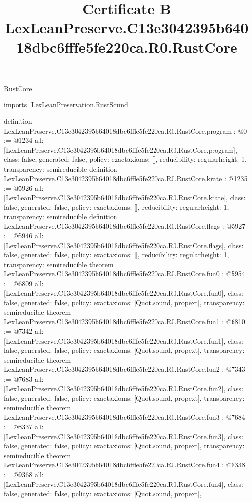\begin{lexlean}{RustCore}
\title{Certificate B LexLeanPreserve.C13e3042395b64018dbc6fffe5fe220ca.R0.RustCore}
\begin{coremodule}
imports [LexLeanPreservation.RustSound]

definition LexLeanPreserve.C13e3042395b64018dbc6fffe5fe220ca.R0.RustCore.program : @0 := @1234 {
  all: [LexLeanPreserve.C13e3042395b64018dbc6fffe5fe220ca.R0.RustCore.program],
  class: false,
  generated: false,
  policy: exact{axioms: []},
  reducibility: regular{height: 1},
  transparency: semireducible
}
definition LexLeanPreserve.C13e3042395b64018dbc6fffe5fe220ca.R0.RustCore.krate : @1235 := @5926 {
  all: [LexLeanPreserve.C13e3042395b64018dbc6fffe5fe220ca.R0.RustCore.krate],
  class: false,
  generated: false,
  policy: exact{axioms: []},
  reducibility: regular{height: 1},
  transparency: semireducible
}
definition LexLeanPreserve.C13e3042395b64018dbc6fffe5fe220ca.R0.RustCore.flags : @5927 := @5946 {
  all: [LexLeanPreserve.C13e3042395b64018dbc6fffe5fe220ca.R0.RustCore.flags],
  class: false,
  generated: false,
  policy: exact{axioms: []},
  reducibility: regular{height: 1},
  transparency: semireducible
}
theorem LexLeanPreserve.C13e3042395b64018dbc6fffe5fe220ca.R0.RustCore.fun0 : @5954 := @6809 {
  all: [LexLeanPreserve.C13e3042395b64018dbc6fffe5fe220ca.R0.RustCore.fun0],
  class: false,
  generated: false,
  policy: exact{axioms: [Quot.sound, propext]},
  transparency: semireducible
}
theorem LexLeanPreserve.C13e3042395b64018dbc6fffe5fe220ca.R0.RustCore.fun1 : @6810 := @7342 {
  all: [LexLeanPreserve.C13e3042395b64018dbc6fffe5fe220ca.R0.RustCore.fun1],
  class: false,
  generated: false,
  policy: exact{axioms: [Quot.sound, propext]},
  transparency: semireducible
}
theorem LexLeanPreserve.C13e3042395b64018dbc6fffe5fe220ca.R0.RustCore.fun2 : @7343 := @7683 {
  all: [LexLeanPreserve.C13e3042395b64018dbc6fffe5fe220ca.R0.RustCore.fun2],
  class: false,
  generated: false,
  policy: exact{axioms: [Quot.sound, propext]},
  transparency: semireducible
}
theorem LexLeanPreserve.C13e3042395b64018dbc6fffe5fe220ca.R0.RustCore.fun3 : @7684 := @8337 {
  all: [LexLeanPreserve.C13e3042395b64018dbc6fffe5fe220ca.R0.RustCore.fun3],
  class: false,
  generated: false,
  policy: exact{axioms: [Quot.sound, propext]},
  transparency: semireducible
}
theorem LexLeanPreserve.C13e3042395b64018dbc6fffe5fe220ca.R0.RustCore.fun4 : @8338 := @9368 {
  all: [LexLeanPreserve.C13e3042395b64018dbc6fffe5fe220ca.R0.RustCore.fun4],
  class: false,
  generated: false,
  policy: exact{axioms: [Quot.sound, propext]},
}
\end{coremodule}
\end{lexlean}
